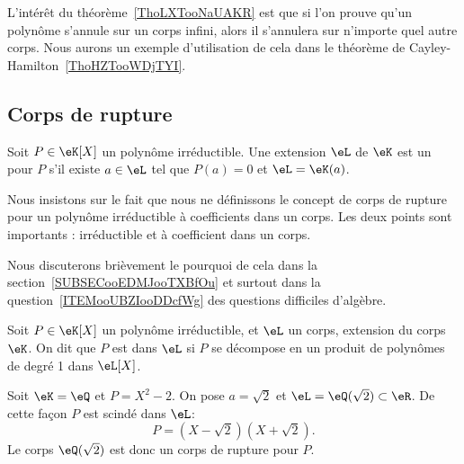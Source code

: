 \begin{remark}
    L'intérêt du théorème~\ref{ThoLXTooNaUAKR} est que si l'on prouve qu'un polynôme s'annule sur un corps infini, alors il s'annulera sur n'importe quel autre corps. Nous aurons un exemple d'utilisation de cela dans le théorème de Cayley-Hamilton~\ref{ThoHZTooWDjTYI}.
\end{remark}

\subsection{Corps de rupture}

\begin{definition}      \label{DEFooVALTooDJJmJv}
    Soit \( P\in\eK[X]\) un polynôme irréductible. Une extension \( \eL\) de \( \eK\) est un  pour \( P\) s'il existe \( a\in \eL\) tel que \( P(a)=0\) et \( \eL=\eK(a)\).
\end{definition}

\begin{normaltext}      \label{NORMALooTPOIooVZAfUo}
    Nous insistons sur le fait que nous ne définissons le concept de corps de rupture pour un polynôme irréductible à coefficients dans un corps. Les deux points sont importants : irréductible et à coefficient dans un corps.

    Nous discuterons brièvement le pourquoi de cela dans la section~\ref{SUBSECooEDMJooTXBfOu} et surtout dans la question~\ref{ITEMooUBZIooDDcfWg} des questions difficiles d'algèbre.
\end{normaltext}

\begin{definition}\label{DefPolynomeScinde}
  Soit \( P\in\eK[X]\) un polynôme irréductible, et \( \eL\) un corps, extension du corps \( \eK\). On dit que \( P \) est  dans \( \eL \) si \( P \) se décompose en un produit de polynômes de degré 1 dans \( \eL[X]\).
\end{definition}

\begin{example}     \label{ExemGVxJUC}
    Soit \( \eK=\eQ\) et \( P=X^2-2\). On pose \( a=\sqrt{2}\) et \( \eL=\eQ(\sqrt{2})\subset\eR\). De cette façon \( P\) est scindé dans \( \eL \):
    \begin{equation}
        P=(X-\sqrt{2})(X+\sqrt{2}).
    \end{equation}
    Le corps \( \eQ(\sqrt{2})\) est donc un corps de rupture pour \( P\).
\end{example}

